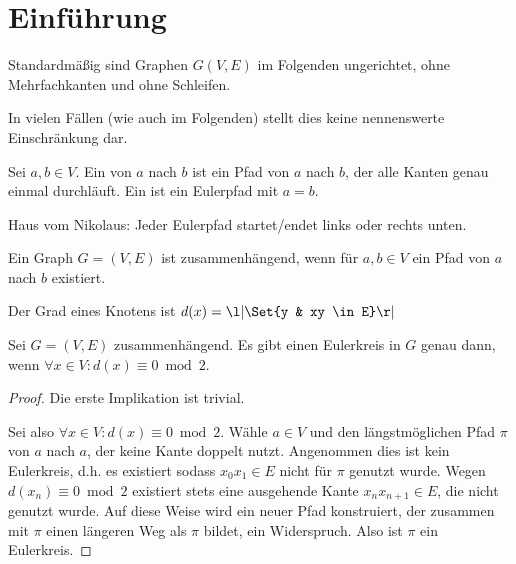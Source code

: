 \chapter{Einführung}


\begin{conv}
    Standardmäßig sind Graphen $G(V, E)$ im Folgenden ungerichtet, ohne Mehrfachkanten und ohne Schleifen.
\end{conv}

In vielen Fällen (wie auch im Folgenden) stellt dies keine nennenswerte Einschränkung dar.

\begin{df}
    Sei $a, b \in V$.
    Ein  von $a$ nach $b$ ist ein Pfad von $a$ nach $b$, der alle Kanten genau einmal durchläuft.
    Ein  ist ein Eulerpfad mit $a = b$.
\end{df}

\begin{ex}
    Haus vom Nikolaus: Jeder Eulerpfad startet/endet links oder rechts unten.
\end{ex}

\begin{df}
    Ein Graph $G = (V, E)$ ist zusammenhängend, wenn für $a,b \in V$ ein Pfad von $a$ nach $b$ existiert.
\end{df}

\begin{df}
    Der Grad eines Knotens ist
    \begin{math}
        d(x) = \l| \Set{y & xy \in E} \r|
    \end{math}
\end{df}

\begin{st}
    Sei $G = (V, E)$ zusammenhängend.
    Es gibt einen Eulerkreis in $G$ genau dann, wenn $\forall x \in V: d(x) \equiv 0 \bmod 2$.
    \begin{proof}
        Die erste Implikation ist trivial.

        Sei also $\forall x \in V: d(x) \equiv 0 \bmod 2$.
        Wähle $a \in V$ und den längstmöglichen Pfad $\pi$ von $a$ nach $a$, der keine Kante doppelt nutzt.
        Angenommen dies ist kein Eulerkreis, d.h. es existiert sodass $x_0x_1 \in E$ nicht für $\pi$ genutzt wurde.
        Wegen $d(x_n) \equiv 0 \bmod 2$ existiert stets eine ausgehende Kante $x_nx_{n+1} \in E$, die nicht genutzt wurde.
        Auf diese Weise wird ein neuer Pfad konstruiert, der zusammen mit $\pi$ einen längeren Weg als $\pi$ bildet, ein Widerspruch.
        Also ist $\pi$ ein Eulerkreis.
    \end{proof}
\end{st}

